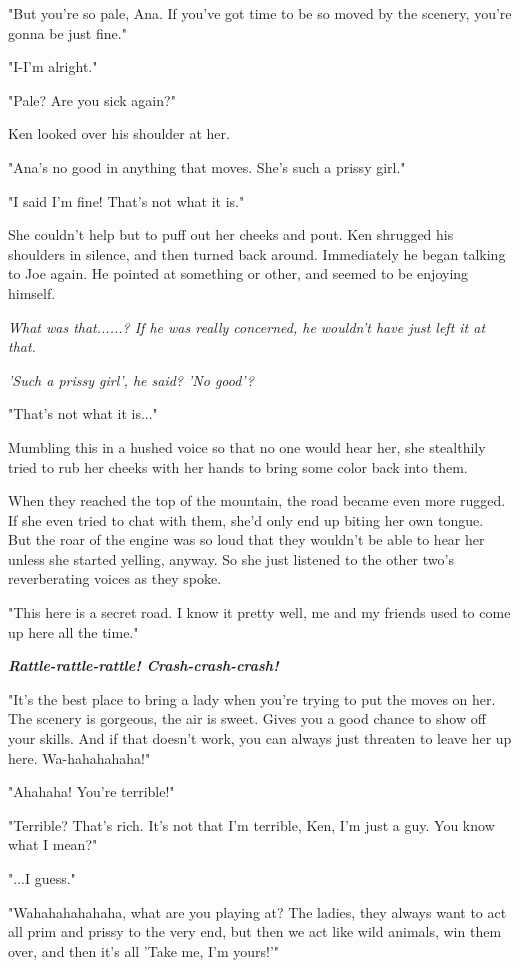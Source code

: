 \documentclass[
]{article}
\begin{document}
"But you're so pale, Ana. If you've got time to be so moved by the
scenery, you're gonna be just fine."

"I-I'm alright."

"Pale? Are you sick again?"

Ken looked over his shoulder at her.

"Ana's no good in anything that moves. She's such a prissy girl."

"I said I'm fine! That's not what it is."

She couldn't help but to puff out her cheeks and pout. Ken shrugged his
shoulders in silence, and then turned back around. Immediately he began
talking to Joe again. He pointed at something or other, and seemed to be
enjoying himself.

\emph{What was that......? If he was really concerned, he wouldn't have
just left it at that.}

\emph{'Such a prissy girl', he said? 'No good'?}

"That's not what it is..."

Mumbling this in a hushed voice so that no one would hear her, she
stealthily tried to rub her cheeks with her hands to bring some color
back into them.

When they reached the top of the mountain, the road became even more
rugged. If she even tried to chat with them, she'd only end up biting
her own tongue.　But the roar of the engine was so loud that they
wouldn't be able to hear her unless she started yelling, anyway. So she
just listened to the other two's reverberating voices as they spoke.

"This here is a secret road. I know it pretty well, me and my friends
used to come up here all the time."

\emph{\textbf{Rattle-rattle-rattle! Crash-crash-crash!}}

"It's the best place to bring a lady when you're trying to put the moves
on her. The scenery is gorgeous, the air is sweet. Gives you a good
chance to show off your skills. And if that doesn't work, you can always
just threaten to leave her up here. Wa-hahahahaha!"

"Ahahaha! You're terrible!"

"Terrible? That's rich. It's not that I'm terrible, Ken, I'm just a guy.
You know what I mean?"

"...I guess."

"Wahahahahahaha, what are you playing at? The ladies, they always want
to act all prim and prissy to the very end, but then we act like wild
animals, win them over, and then it's all 'Take me, I'm yours!'"
\end{document}

